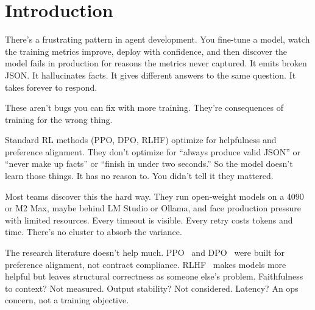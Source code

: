 \documentclass[11pt]{article}
\begin{document}
\begin{abstract}
But there is no single threshold.  T1 (intent) and T4 (function routing) are universally learnable; even 1B models achieve near-perfect validity.  T3 (tool calling) and T5 (code patching) are hard: only Qwen3-4B and 9B+ models sustain learning.  Most revealing is the Mixed condition: multi-task training causes catastrophic forgetting in smaller models (Yi-1.5-6B drops from 98\% on T1 to 0\% on Mixed), while Qwen3-4B and Gemma-2-9B sustain 82--90\%.

NVIDIA's work shows small models are 10--30$\times$ cheaper to deploy.  Ours shows they \emph{can} learn simple structured tasks but cannot learn complex ones or hold up under multi-task pressure.  The implication is a task-aware deployment strategy: match model capacity to task complexity, and default to 9B+ when multi-task reliability matters.
\end{abstract}

\section{Introduction}

There's a frustrating pattern in agent development.  You fine-tune a model, watch the training metrics improve, deploy with confidence, and then discover the model fails in production for reasons the metrics never captured.  It emits broken JSON.  It hallucinates facts.  It gives different answers to the same question.  It takes forever to respond.

These aren't bugs you can fix with more training.  They're consequences of training for the wrong thing.

Standard RL methods (PPO, DPO, RLHF) optimize for helpfulness and preference alignment.  They don't optimize for ``always produce valid JSON'' or ``never make up facts'' or ``finish in under two seconds.'' So the model doesn't learn those things.  It has no reason to.  You didn't tell it they mattered.

Most teams discover this the hard way.  They run open-weight models on a 4090 or M2 Max, maybe behind LM Studio or Ollama, and face production pressure with limited resources.  Every timeout is visible.  Every retry costs tokens and time.  There's no cluster to absorb the variance.

The research literature doesn't help much.  PPO~\citep{schulman2017ppo} and DPO~\citep{rafailov2023dpo} were built for preference alignment, not contract compliance.  RLHF~\citep{ouyang2022rlhf} makes models more helpful but leaves structural correctness as someone else's problem.  Faithfulness to context? Not measured.  Output stability? Not considered.  Latency? An ops concern, not a training objective.
\end{document}
